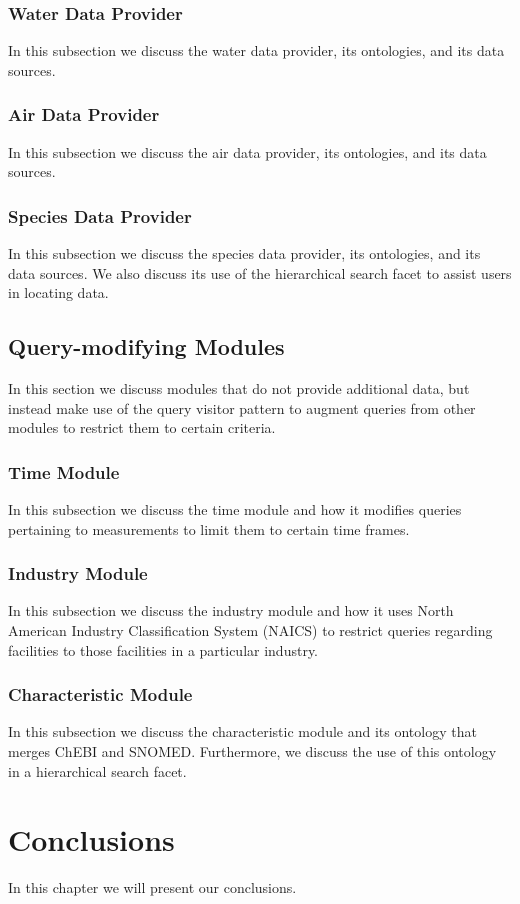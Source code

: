 \documentclass[letterpaper]{report}
\begin{document}
\subsection{Water Data Provider}
In this subsection we discuss the water data provider, its ontologies, and its data sources.
\subsection{Air Data Provider}
In this subsection we discuss the air data provider, its ontologies, and its data sources.
\subsection{Species Data Provider}
In this subsection we discuss the species data provider, its ontologies, and its data sources. We also discuss its use of the hierarchical search facet to assist users in locating data.
\section{Query-modifying Modules}
In this section we discuss modules that do not provide additional data, but instead make use of the query visitor pattern to augment queries from other modules to restrict them to certain criteria.
\subsection{Time Module}
In this subsection we discuss the time module and how it modifies queries pertaining to measurements to limit them to certain time frames.
\subsection{Industry Module}
In this subsection we discuss the industry module and how it uses North American Industry Classification System (NAICS) to restrict queries regarding facilities to those facilities in a particular industry.
\subsection{Characteristic Module}
In this subsection we discuss the characteristic module and its ontology that merges ChEBI and SNOMED. Furthermore, we discuss the use of this ontology in a hierarchical search facet.
\chapter{Conclusions}
In this chapter we will present our conclusions.
\end{document}
